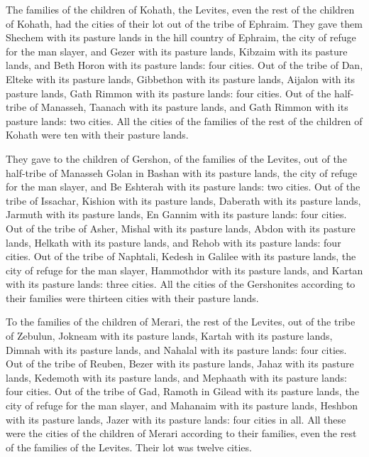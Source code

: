  The families of the children of Kohath, the Levites,
even the rest of the children of Kohath, had the cities of their lot out
of the tribe of Ephraim.  They gave them Shechem with its
pasture lands in the hill country of Ephraim, the city of refuge for the
man slayer, and Gezer with its pasture lands,  Kibzaim
with its pasture lands, and Beth Horon with its pasture lands: four
cities.  Out of the tribe of Dan, Elteke with its pasture
lands, Gibbethon with its pasture lands,  Aijalon with
its pasture lands, Gath Rimmon with its pasture lands: four cities.
 Out of the half-tribe of Manasseh, Taanach with its
pasture lands, and Gath Rimmon with its pasture lands: two cities.
 All the cities of the families of the rest of the
children of Kohath were ten with their pasture lands.

 They gave to the children of Gershon, of the families of
the Levites, out of the half-tribe of Manasseh Golan in Bashan with its
pasture lands, the city of refuge for the man slayer, and Be Eshterah
with its pasture lands: two cities.  Out of the tribe of
Issachar, Kishion with its pasture lands, Daberath with its pasture
lands,  Jarmuth with its pasture lands, En Gannim with
its pasture lands: four cities.  Out of the tribe of
Asher, Mishal with its pasture lands, Abdon with its pasture lands,
 Helkath with its pasture lands, and Rehob with its
pasture lands: four cities.  Out of the tribe of
Naphtali, Kedesh in Galilee with its pasture lands, the city of refuge
for the man slayer, Hammothdor with its pasture lands, and Kartan with
its pasture lands: three cities.  All the cities of the
Gershonites according to their families were thirteen cities with their
pasture lands.

 To the families of the children of Merari, the rest of
the Levites, out of the tribe of Zebulun, Jokneam with its pasture
lands, Kartah with its pasture lands,  Dimnah with its
pasture lands, and Nahalal with its pasture lands: four cities.
 Out of the tribe of Reuben, Bezer with its pasture
lands, Jahaz with its pasture lands,  Kedemoth with its
pasture lands, and Mephaath with its pasture lands: four cities.
 Out of the tribe of Gad, Ramoth in Gilead with its
pasture lands, the city of refuge for the man slayer, and Mahanaim with
its pasture lands,  Heshbon with its pasture lands, Jazer
with its pasture lands: four cities in all.  All these
were the cities of the children of Merari according to their families,
even the rest of the families of the Levites. Their lot was twelve
cities.


